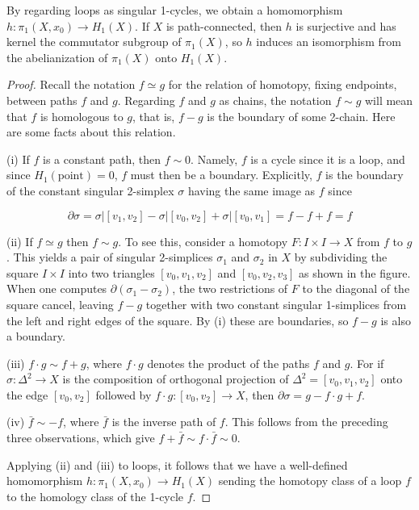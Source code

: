 \begin{theorem}
\label{thm:hurewicz-dimension-1}
By regarding loops as singular 1-cycles, we obtain a homomorphism $h: \pi_1(X, x_0) \to H_1(X)$. If $X$ is path-connected, then $h$ is surjective and has kernel the commutator subgroup of $\pi_1(X)$, so $h$ induces an isomorphism from the abelianization of $\pi_1(X)$ onto $H_1(X)$.
\end{theorem}
\begin{proof}
 Recall the notation $f \simeq g$ for the relation of homotopy, fixing endpoints, between paths $f$ and $g$. Regarding $f$ and $g$ as chains, the notation $f \sim g$ will mean that $f$ is homologous to $g$, that is, $f - g$ is the boundary of some 2-chain. Here are some facts about this relation.

(i) If $f$ is a constant path, then $f \sim 0$. Namely, $f$ is a cycle since it is a loop, and since $H_1(\text{point}) = 0$, $f$ must then be a boundary. Explicitly, $f$ is the boundary of the constant singular 2-simplex $\sigma$ having the same image as $f$ since

\[
\partial \sigma = \sigma|[v_1, v_2] - \sigma|[v_0, v_2] + \sigma|[v_0, v_1] = f - f + f = f
\]

(ii) If $f \simeq g$ then $f \sim g$. To see this, consider a homotopy $F: I \times I \to X$ from $f$ to $g$. This yields a pair of singular 2-simplices $\sigma_1$ and $\sigma_2$ in $X$ by subdividing the square $I \times I$ into two triangles $[v_0, v_1, v_2]$ and $[v_0, v_2, v_3]$ as shown in the figure. When one computes $\partial(\sigma_1 - \sigma_2)$, the two restrictions of $F$ to the diagonal of the square cancel, leaving $f - g$ together with two constant singular 1-simplices from the left and right edges of the square. By (i) these are boundaries, so $f - g$ is also a boundary.

(iii) $f \cdot g \sim f + g$, where $f \cdot g$ denotes the product of the paths $f$ and $g$. For if $\sigma: \Delta^2 \to X$ is the composition of orthogonal projection of $\Delta^2 = [v_0, v_1, v_2]$ onto the edge $[v_0, v_2]$ followed by $f \cdot g: [v_0, v_2] \to X$, then $\partial \sigma = g - f \cdot g + f$.

(iv) $\bar{f} \sim -f$, where $\bar{f}$ is the inverse path of $f$. This follows from the preceding three observations, which give $f + \bar{f} \sim f \cdot \bar{f} \sim 0$.

Applying (ii) and (iii) to loops, it follows that we have a well-defined homomorphism $h: \pi_1(X, x_0) \to H_1(X)$ sending the homotopy class of a loop $f$ to the homology class of the 1-cycle $f$.




\end{proof}
